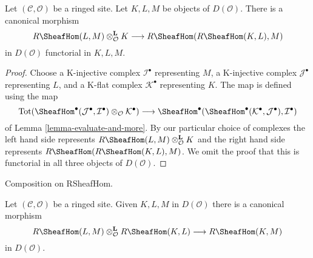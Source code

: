 \begin{lemma}
\label{lemma-internal-hom-evaluate}
Let $(\mathcal{C}, \mathcal{O})$ be a ringed site. Let $K, L, M$ be objects of
$D(\mathcal{O})$. There is a canonical morphism
$$
R\SheafHom(L, M) \otimes_\mathcal{O}^\mathbf{L} K
\longrightarrow
R\SheafHom(R\SheafHom(K, L), M)
$$
in $D(\mathcal{O})$ functorial in $K, L, M$.
\end{lemma}

\begin{proof}
Choose
a K-injective complex $\mathcal{I}^\bullet$ representing $M$,
a K-injective complex $\mathcal{J}^\bullet$ representing $L$, and
a K-flat complex $\mathcal{K}^\bullet$ representing $K$.
The map is defined using the map
$$
\text{Tot}(\SheafHom^\bullet(\mathcal{J}^\bullet,
\mathcal{I}^\bullet) \otimes_\mathcal{O} \mathcal{K}^\bullet)
\longrightarrow
\SheafHom^\bullet(\SheafHom^\bullet(\mathcal{K}^\bullet,
\mathcal{J}^\bullet), \mathcal{I}^\bullet)
$$
of Lemma \ref{lemma-evaluate-and-more}. By our particular
choice of complexes the left hand side represents
$R\SheafHom(L, M) \otimes_\mathcal{O}^\mathbf{L} K$
and the right hand side represents
$R\SheafHom(R\SheafHom(K, L), M)$. We omit the proof that
this is functorial in all three objects of $D(\mathcal{O})$.
\end{proof}

\begin{lemma}
\label{lemma-internal-hom-composition}
\begin{slogan}
Composition on RSheafHom.
\end{slogan}
Let $(\mathcal{C}, \mathcal{O})$ be a ringed site. Given $K, L, M$ in
$D(\mathcal{O})$ there is a canonical morphism
$$
R\SheafHom(L, M) \otimes_\mathcal{O}^\mathbf{L} R\SheafHom(K, L)
\longrightarrow R\SheafHom(K, M)
$$
in $D(\mathcal{O})$.
\end{lemma}

